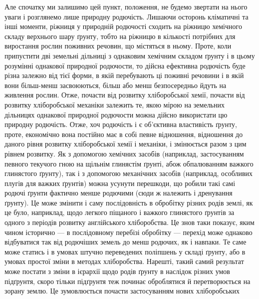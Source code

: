 Але спочатку ми залишимо цей пункт, положення, не будемо звертати на
нього уваги і розглянемо лише природну родючість. Лишаючи осторонь кліматичні
та інші моменти, ріжниця у природній родючості сходить на ріжницю
хемічного складу верхнього шару ґрунту, тобто на ріжницю в кількості потрібних
для виростання рослин поживних речовин, що містяться в ньому. Проте, коли
припустити дві земельні дільниці з однаковим хемічним складом ґрунту і в
цьому розумінні однакової природної родючости, то дійсна ефективна родючість
буде різна залежно від тієї форми, в якій перебувають ці поживні речовини і в якій
вони більш-менш засвоюються, більш або менш безпосередньо йдуть на живлення
рослин. Отже, почасти від розвитку хліборобської хемії, почасти від розвитку
хліборобської механіки залежить те, якою мірою на земельних дільницях однакової
природної родючости можна дійсно використати цю природну родючість.
Отже, хоч родючість і є об’єктивна властивість ґрунту, проте, економічно вона
постійно має в собі певне відношення, відношення до даного рівня розвитку
хліборобської хемії і механіки, і змінюється разом з цим рівнем розвитку.
Як з допомогою хемічних засобів (наприклад, застосуванням певного текучого
гною на щільнім глинястім ґрунті, абож обпалюванням важкого глинястого
ґрунту), так і з допомогою механічних засобів (наприклад, особливих
плугів для важких ґрунтів) можна усунути перешкоди, що робили такі самі
родючі ґрунти фактично менше родючими (сюди ж належить і дренування ґрунту).
Це може змінити і саму послідовність в обробітку різних родів землі, як це
було, наприклад, щодо легкого піщаного і важкого глинястого ґрунтів за одного
з періодів розвитку англійського хліборобства. Це знов таки показує, яким
чином історично — в послідовному перебізі обробітку — перехід може однаково відбуватися
так від родючіших земель до менш родючих, як і навпаки. Те саме
може статись і в умовах штучно переведених поліпшень у складі ґрунту, або
в умовах простої зміни в методах хліборобства. Нарешті, такий самий результат
може постати з зміни в ієрархії щодо родів ґрунту в наслідок різних умов
підґрунтя, скоро тільки підґрунтя теж починає оброблятися й перетворюється
на зорану землю. Це зумовлюється почасти застосуванням нових хліборобських
